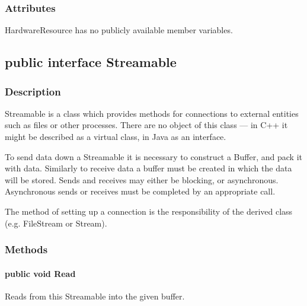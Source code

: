\documentclass[$Date: 2003/06/26 19:29:31 $]{glabarticle}
\begin{document}
\subsubsection{Attributes}

HardwareResource has no publicly available member variables. 


\newpage

\subsection{public interface Streamable}


\subsubsection{Description}

Streamable is a class which provides methods for connections to
external entities such as files or other processes.  There are no
object of this class --- in C++ it might be described as a virtual
class, in Java as an interface.

To send data down a Streamable it is necessary to construct a Buffer, and
pack it with data.  Similarly to receive data a buffer must be created
in which the data will be stored.  Sends and receives may either be
blocking, or asynchronous.  Asynchronous sends or receives must be
completed by an appropriate call.

The method of setting up a connection is the responsibility of the
derived class (e.g. FileStream or Stream).


\subsubsection{Methods}

\paragraph{public void Read}

Reads from this Streamable into the given buffer. 
\end{document}
